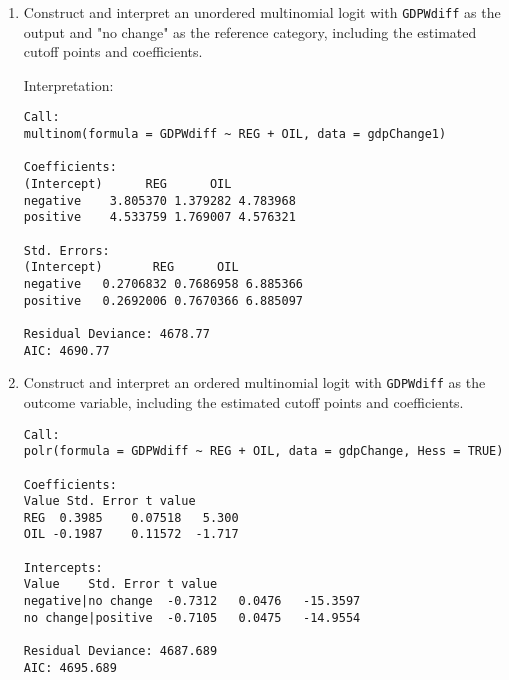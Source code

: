 \documentclass[12pt,letterpaper]{article}
\begin{document}
\begin{enumerate}
	\item Construct and interpret an unordered multinomial logit with \texttt{GDPWdiff} as the output and "no change" as the reference category, including the estimated cutoff points and coefficients.
	
	Interpretation:
	\begin{Verbatim}
Call:
multinom(formula = GDPWdiff ~ REG + OIL, data = gdpChange1)

Coefficients:
(Intercept)      REG      OIL
negative    3.805370 1.379282 4.783968
positive    4.533759 1.769007 4.576321

Std. Errors:
(Intercept)       REG      OIL
negative   0.2706832 0.7686958 6.885366
positive   0.2692006 0.7670366 6.885097

Residual Deviance: 4678.77 
AIC: 4690.77
	\end{Verbatim}
	\item Construct and interpret an ordered multinomial logit with \texttt{GDPWdiff} as the outcome variable, including the estimated cutoff points and coefficients.
	
	\begin{Verbatim}
Call:
polr(formula = GDPWdiff ~ REG + OIL, data = gdpChange, Hess = TRUE)

Coefficients:
Value Std. Error t value
REG  0.3985    0.07518   5.300
OIL -0.1987    0.11572  -1.717

Intercepts:
Value    Std. Error t value 
negative|no change  -0.7312   0.0476   -15.3597
no change|positive  -0.7105   0.0475   -14.9554

Residual Deviance: 4687.689 
AIC: 4695.689 
	\end{Verbatim}
\end{enumerate}
\end{document}
